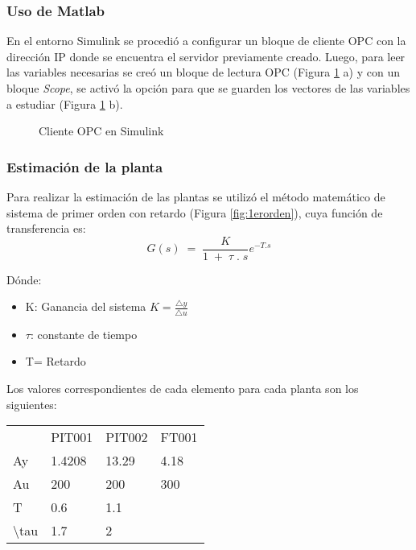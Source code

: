 \subsubsection{Uso de Matlab}
En el entorno Simulink se procedió a configurar un bloque de cliente OPC con la dirección IP donde se encuentra el servidor previamente creado. Luego, para leer las variables necesarias se creó un bloque de lectura OPC (Figura \ref{fig:opcsimu} a) y con un bloque \textit{Scope}, se activó la opción para que se guarden los vectores de las variables a estudiar (Figura \ref{fig:opcsimu} b). 


\begin{figure}[htbp]
	\centering
	\caption{Cliente OPC en Simulink} \label{fig:opcsimu}
\end{figure}



\subsubsection{Estimación de la planta}

Para realizar la estimación de las plantas se utilizó el método matemático de sistema de primer orden con retardo (Figura \ref{fig:1erorden}), cuya función de transferencia es: \\
\begin{equation}
	G(s)\;=\;\frac K{1\;+\;\tau\;.\;s}e^{-T.s}
\end{equation}


Dónde:
\begin{itemize}
	\item K:  Ganancia del sistema $K = \frac{\triangle y}{\triangle u}$
	\item $\tau$: constante de tiempo
	\item T= Retardo
\end{itemize}

Los valores correspondientes de cada elemento para cada planta son los siguientes: 
\begin{table}[]
	\centering
	\begin{tabular}{llll}
		& PIT001 & PIT002 & FT001 \\
		Ay & 1.4208 & 13.29 & 4.18 \\
		Au & 200 & 200 & 300 \\
		T & 0.6 & 1.1 &  \\
		\textbackslash{}tau & 1.7 & 2 & 
	\end{tabular}
\end{table}


